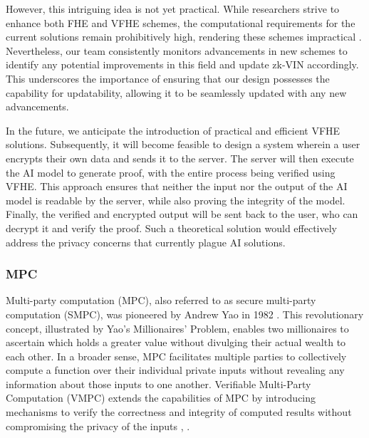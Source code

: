 \documentclass[conference]{IEEEtran}
\begin{document}
However, this intriguing idea is not yet practical. While researchers strive to enhance both FHE and VFHE schemes, the computational requirements for the current solutions remain prohibitively high, rendering these schemes impractical . Nevertheless, our team consistently monitors advancements in new schemes to identify any potential improvements in this field and update zk-VIN accordingly. This underscores the importance of ensuring that our design possesses the capability for updatability, allowing it to be seamlessly updated with any new advancements.

In the future, we anticipate the introduction of practical and efficient VFHE solutions. Subsequently, it will become feasible to design a system wherein a user encrypts their own data and sends it to the server. The server will then execute the AI model to generate proof, with the entire process being verified using VFHE. This approach ensures that neither the input nor the output of the AI model is readable by the server, while also proving the integrity of the model. Finally, the verified and encrypted output will be sent back to the user, who can decrypt it and verify the proof. Such a theoretical solution would effectively address the privacy concerns that currently plague AI solutions.


\subsubsection{MPC}
Multi-party computation (MPC), also referred to as secure multi-party computation (SMPC), was pioneered by Andrew Yao in 1982 . This revolutionary concept, illustrated by Yao's Millionaires' Problem, enables two millionaires to ascertain which holds a greater value without divulging their actual wealth to each other. In a broader sense, MPC facilitates multiple parties to collectively compute a function over their individual private inputs without revealing any information about those inputs to one another. Verifiable Multi-Party Computation (VMPC) extends the capabilities of MPC by introducing mechanisms to verify the correctness and integrity of computed results without compromising the privacy of the inputs , .
\end{document}
